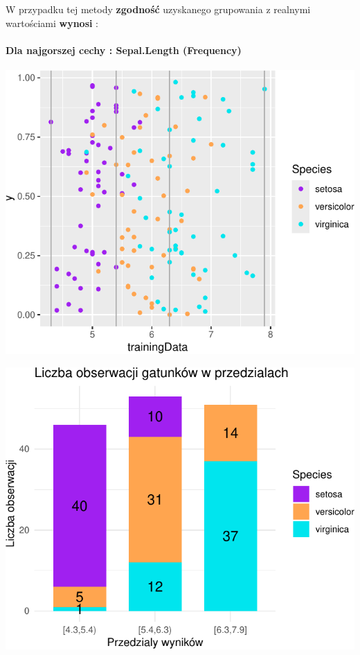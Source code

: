 \documentclass[
  12pt,
]{article}
\begin{document}
W przypadku tej metody \textbf{zgodność} uzyskanego grupowania z
realnymi wartościami \textbf{wynosi} :

\paragraph{Dla najgorszej cechy : Sepal.Length
(Frequency)}\label{dla-najgorszej-cechy-sepal.length-frequency}

\begin{center}\includegraphics{Sprawozdanie2_files/figure-latex/frequences_najg-1} \end{center}

\begin{center}\includegraphics{Sprawozdanie2_files/figure-latex/tabela_kondygnacji_1_najg-1} \end{center}
\end{document}
